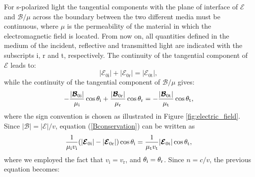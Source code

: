 \indent For s-polarized light the tangential components with the plane of interface of $\boldsymbol{\mathcal{E}}$ and $\boldsymbol{\mathcal{B}}/\mu$ across the boundary between the two different media must be continuous, where $\mu$ is the permeability of the material in which the electromagnetic field is located. From now on, all quantities defined in the medium of the incident, reflective and transmitted light are indicated with the subscripts \textrm{i}, \textrm{r} and \textrm{t}, respectively. The continuity of the tangential component of $\boldsymbol{\mathcal{E}}$ leads to:
\begin{equation}\label{Econservation}
|\boldsymbol{\mathcal{E}}_{0\textrm{i}}|+|\boldsymbol{\mathcal{E}}_{0\textrm{r}}|= |\boldsymbol{\mathcal{E}}_{0\textrm{t}}|,
\end{equation} 
while the continuity of the tangential component of $\boldsymbol{\mathcal{B}}/\mu$ gives:
\begin{equation}\label{Bconservation}
-\frac{|\boldsymbol{\mathcal{B}}_{0\textrm{i}}|}{\mu_\textrm{i}}\cos\theta_{\textrm{i}}+\frac{|\boldsymbol{\mathcal{B}}_{0\textrm{r}}|}{\mu_\textrm{r}}\cos\theta_{\textrm{r}} = 
-\frac{|\boldsymbol{\mathcal{B}}_{0\textrm{t}}|}{\mu_\textrm{t}}\cos\theta_{\textrm{t}},
\end{equation}
where the sign convention is chosen as illustrated in Figure \ref{fig:electric_field}.
Since $|\boldsymbol{\mathcal{B}}| = |\boldsymbol{\mathcal{E}}|/v$, equation (\ref{Bconservation}) can be written as 
\begin{equation}
\frac{1}{\mu_{\textrm{i}}v_{\textrm{i}}}(|\boldsymbol{\mathcal{E}}_{0\textrm{i}}|-|\boldsymbol{\mathcal{E}}_{0\textrm{r}}|)\cos\theta_{\textrm{i}} = \frac{1}{\mu_{\textrm{t}}v_{\textrm{t}}}|\boldsymbol{\mathcal{E}}_{0\textrm{t}}|\cos\theta_{\textrm{t}},
\end{equation}
where we employed the fact that $v_{\textrm{i}}= v_{\textrm{r}}$, and $\theta_{\textrm{i}}= \theta_{\textrm{r}}$. 
Since $n = c/v$, the previous equation becomes:
